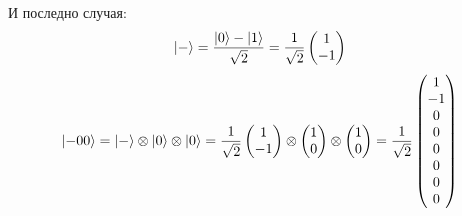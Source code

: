 \documentclass[11pt,oneside,a4paper]{article}
\begin{document}
И последно случая:
\begin{equation}
    {\left\vert{-}\right\rangle} = \frac{{\left\vert{0}\right\rangle} - {\left\vert{1}\right\rangle}}{\sqrt{2}} = \frac{1}{\sqrt{2}}\begin{pmatrix}1\\-1\end{pmatrix}
\end{equation}
\begin{equation}
    {\left\vert{-00}\right\rangle} = {\left\vert{-}\right\rangle} \otimes {\left\vert{0}\right\rangle} \otimes {\left\vert{0}\right\rangle}
    = \frac{1}{\sqrt{2}}\begin{pmatrix}1\\-1\end{pmatrix}
    \otimes \begin{pmatrix}1\\0\end{pmatrix}
    \otimes \begin{pmatrix}1\\0\end{pmatrix} =
    \frac{1}{\sqrt{2}} \begin{pmatrix}1\\-1\\0\\0\\0\\0\\0\\0\end{pmatrix}
\end{equation}
\end{document}
